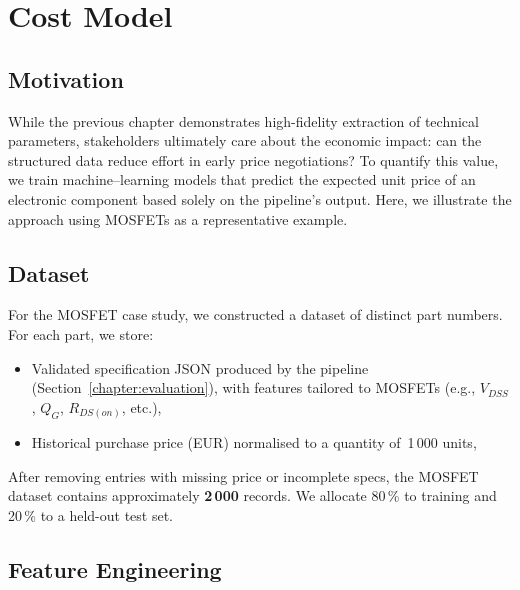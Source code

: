 \section{Cost Model}
\label{chapter:costmodel}

\subsection{Motivation}
While the previous chapter demonstrates high-fidelity extraction of technical parameters, stakeholders ultimately care about the economic impact: can the structured data reduce effort in early price negotiations? To quantify this value, we train machine–learning models that predict the expected unit price of an electronic component based solely on the pipeline's output. Here, we illustrate the approach using MOSFETs as a representative example.

\subsection{Dataset}
For the MOSFET case study, we constructed a dataset of distinct part numbers. For each part, we store:
\begin{itemize}
  \item Validated specification JSON produced by the pipeline (Section~\ref{chapter:evaluation}), with features tailored to MOSFETs (e.g., $V_{DSS}$, $Q_G$, $R_{DS(on)}$, etc.),
  \item Historical purchase price (EUR) normalised to a quantity of~1\,000 units,
\end{itemize}
After removing entries with missing price or incomplete specs, the MOSFET dataset contains approximately \textbf{2\,000} records. We allocate 80\,\% to training and 20\,\% to a held-out test set.

\subsection{Feature Engineering}

